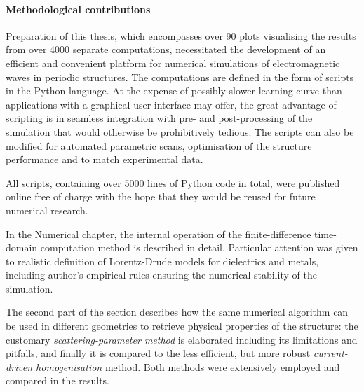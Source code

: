 \paragraph{Methodological contributions}
Preparation of this thesis, which encompasses over 90 plots visualising the results from over 4000 separate computations, necessitated the development of an efficient and convenient platform for numerical simulations of electromagnetic waves in periodic structures.
The computations are defined in the form of scripts in the Python language. At the expense of possibly slower learning curve than applications with a graphical user interface may offer, the great advantage of scripting is in seamless integration with pre- and post-processing of the simulation that would otherwise be prohibitively tedious. The scripts can also be modified for automated parametric scans, optimisation of the structure performance and to match experimental data.

All scripts, containing over 5000 lines of Python code in total, were published online free of charge \cite{dominec2014_meep_metamaterials} with the hope that they would be reused for future numerical research.

In the Numerical chapter, the internal operation of the finite-difference time-domain computation method is described in detail. Particular attention was given to realistic definition of Lorentz-Drude models for dielectrics and metals, including author's empirical rules ensuring the numerical stability of the simulation. %


The second part of the section describes how the same numerical algorithm can be used in different geometries to retrieve physical properties of the structure: the customary \textit{scattering-parameter method} is elaborated including its limitations and pitfalls, and finally it is compared to the less efficient, but more robust \textit{current-driven homogenisation} method. Both methods were extensively employed and compared in the results.

